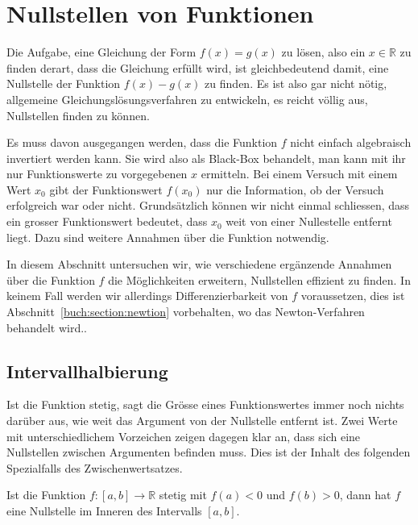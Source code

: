 %
%
%
\section{Nullstellen von Funktionen
\label{buch:section:nullstellen}}
%
Die Aufgabe, eine Gleichung der Form $f(x) = g(x)$
zu lösen, also ein $x\in\mathbb R$ zu finden derart, dass die Gleichung
erfüllt wird, ist gleichbedeutend damit, eine Nullstelle der Funktion
$f(x)-g(x)$ zu finden.
Es ist also gar nicht nötig, allgemeine Gleichungslösungsverfahren zu
entwickeln, es reicht völlig aus, Nullstellen finden zu können.

Es muss davon ausgegangen werden, dass die Funktion $f$ nicht einfach
algebraisch invertiert werden kann.
Sie wird also als Black-Box behandelt, man kann mit ihr nur Funktionswerte
zu vorgegebenen $x$ ermitteln.
%
Bei einem Versuch mit einem Wert $x_0$ gibt der Funktionswert $f(x_0)$
nur die Information, ob der Versuch erfolgreich war oder nicht.
Grundsätzlich können wir nicht einmal schliessen, dass ein
grosser Funktionswert bedeutet, dass $x_0$ weit von einer
Nullestelle entfernt liegt.
Dazu sind weitere Annahmen über die Funktion notwendig.

In diesem Abschnitt untersuchen wir, wie verschiedene ergänzende Annahmen
über die Funktion $f$ die Möglichkeiten erweitern, Nullstellen
effizient zu finden.
In keinem Fall werden wir allerdings Differenzierbarkeit von $f$ voraussetzen,
dies ist Abschnitt~\ref{buch:section:newtion} vorbehalten, wo das
Newton-Verfahren behandelt wird..

%
%
\subsection{Intervallhalbierung
\label{buch:subsection:intervallhalbierung}}
Ist die Funktion stetig, sagt die Grösse eines Funktionswertes immer
noch nichts darüber aus, wie weit das Argument von der Nullstelle
entfernt ist.
Zwei Werte mit unterschiedlichem Vorzeichen zeigen dagegen klar an,
dass sich eine Nullstellen zwischen Argumenten befinden muss.
Dies ist der Inhalt des folgenden Spezialfalls des Zwischenwertsatzes.
%

\begin{satz}
\label{buch:satz:nullstellenzwsatz}
%
Ist die Funktion $f\colon[a,b]\to\mathbb R$ stetig mit $f(a) <0$ und $f(b)>0$,
dann hat $f$ eine Nullstelle im Inneren des Intervalls $[a,b]$.
\end{satz}

